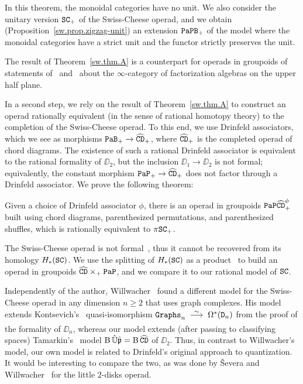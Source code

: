 In this theorem, the monoidal categories have no unit.
We also consider the unitary version $\mathtt{SC}_{+}$ of the Swiss-Cheese operad, and we obtain (Proposition~\ref{sw.prop.zigzag-unit}) an extension $\mathtt{PaPB}_{+}$ of the model where the monoidal categories have a strict unit and the functor strictly preserves the unit.

The result of Theorem~\ref{sw.thm.A} is a counterpart for operads in groupoids of statements of~\cite[Proposition 31]{Ginot2015} and~\cite[Example 2.13]{AyalaFrancisTanaka2017} about the $\infty$-category of factorization algebras on the upper half plane.

In a second step, we rely on the result of Theorem~\ref{sw.thm.A} to construct an operad rationally equivalent (in the sense of rational homotopy theory) to the completion of the Swiss-Cheese operad.
To this end, we use Drinfeld associators, which we see as morphisms $\mathtt{PaB}_{+} \to \widehat{\mathtt{CD}}_{+}$, where $\widehat{\mathtt{CD}}_{+}$ is the completed operad of chord diagrams.
The existence of such a rational Drinfeld associator is equivalent to the rational formality of $\DD_{2}$, but the inclusion $\DD_{1} \to \DD_{2}$ is not formal; equivalently, the constant morphism $\mathtt{PaP}_{+} \to \widehat{\mathtt{CD}}_{+}$ does not factor through a Drinfeld associator.
We prove the following theorem:
\begin{theoremintro} \label{sw.thm.B}
  Given a choice of Drinfeld associator $\phi$, there is an operad in groupoids $\mathtt{PaP}\widehat{\mathtt{CD}}_{+}^{\phi}$ built using chord diagrams, parenthesized permutations, and parenthesized shuffles, which is rationally equivalent to $\pi \mathtt{SC}_{+}$.
\end{theoremintro}

The Swiss-Cheese operad is not formal~\cite{Livernet2015}, thus it cannot be recovered from its homology $H_{*}(\mathtt{SC})$.
We use the splitting of $H_{*}(\mathtt{SC})$ as a product~\cite{Voronov1999} to build an operad in groupoids $\widehat{\mathtt{CD}} \times_{+} \mathtt{PaP}$, and we compare it to our rational model of $\mathtt{SC}$.

Independently of the author, Willwacher~\cite{Willwacher2015a} found a different model for the Swiss-Cheese operad in any dimension $n \ge 2$ that uses graph complexes.
His model extends Kontsevich's~\cite{Kontsevich1999} quasi-isomorphism $\Graphs_{n} \qiso \Omega^{*}(\DD_{n})$ from the proof of the formality of $\DD_{n}$, whereas our model extends (after passing to classifying spaces) Tamarkin's~\cite{Tamarkin2003} model $\operatorname{B} \hat{\mathbb{U}} \hat{\mathfrak{p}} = \operatorname{B} \widehat{\mathtt{CD}}$ of $\DD_{2}$.
Thus, in contrast to Willwacher's model, our own model is related to Drinfeld's original approach to quantization.
It would be interesting to compare the two, as was done by Ševera and Willwacher~\cite{SeveraWillwacher2011} for the little $2$-disks operad.


